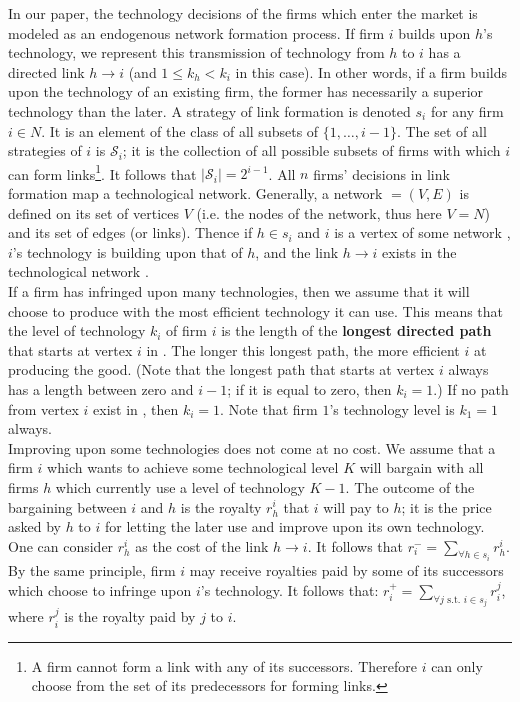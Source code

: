 \documentclass{article}
\begin{document}
\indent In our paper, the technology decisions of the firms which enter the market is modeled as an endogenous network formation process. If firm $i$ builds upon $h$'s technology, we represent this transmission of technology from $h$ to $i$ has a directed link $h\rightarrow i$ (and $1\leq k_h<k_i$ in this case). In other words, if a firm builds upon the technology of an existing firm, the former has necessarily a superior technology than the later. A strategy of link formation is denoted $s_i$ for any firm $i\in N$. It is an element of the class of all subsets of $\{1,\ldots , i-1\}$. The set of all strategies of $i$ is $\mathcal{S}_i$; it is the collection of all possible subsets of firms with which $i$ can form links\footnote{A firm cannot form a link with any of its successors. Therefore $i$ can only choose from the set of its predecessors for forming links.}. It follows that $|\mathcal{S}_i|=2^{i-1}$. All $n$ firms' decisions in link formation map a technological network. Generally, a network $=(V,E)$ is defined on its set of vertices $V$ (i.e. the nodes of the network, thus here $V=N$) and its set of edges (or links). Thence if $h\in s_i$ and $i$ is a vertex of some network , $i$'s technology is building upon that of $h$, and the link $h\rightarrow i$ exists in the technological network .\\
\indent If a firm has infringed upon many technologies, then we assume that it will choose to produce with the most efficient technology it can use. This means that the level of technology $k_i$ of firm $i$ is the length of the \textbf{longest directed path} that starts at vertex $i$ in . The longer this longest path, the more efficient $i$ at producing the good. (Note that the longest path that starts at vertex $i$ always has a length between zero and $i-1$; if it is equal to zero, then $k_i=1$.) If no path from vertex $i$ exist in , then $k_i=1$. Note that firm $1$'s technology level is $k_1=1$ always.  \\
\indent Improving upon some technologies does not come at no cost. We assume that a firm $i$ which wants to achieve some technological level $K$ will bargain with all firms $h$ which currently use a level of technology $K-1$. The outcome of the bargaining between $i$ and $h$ is the royalty $r^{i}_h$ that $i$ will pay to $h$; it is the price asked by $h$ to $i$ for letting the later use and improve upon its own technology. One can consider $r^{i}_h$ as the cost of the link $h\rightarrow i$. It follows that $r^{-}_i=\sum_{\forall h\in s_i}r^{i}_h$. By the same principle, firm $i$ may receive royalties paid by some of its successors which choose to infringe upon $i$'s technology. It follows that: $r^{+}_i=\sum_{\forall j \text{ s.t. } i\in s_j}r^{j}_i$, where $r^{j}_i$ is the royalty paid by $j$ to $i$.  \\
\end{document}
